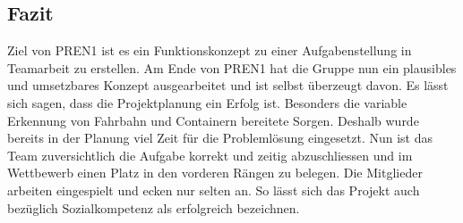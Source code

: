 \subsection{Fazit}
Ziel von PREN1 ist es ein Funktionskonzept zu einer Aufgabenstellung in Teamarbeit zu erstellen. Am Ende von PREN1 hat die Gruppe nun ein plausibles und umsetzbares Konzept ausgearbeitet und ist selbst überzeugt davon. Es lässt sich sagen, dass die Projektplanung ein Erfolg ist. Besonders die variable Erkennung von Fahrbahn und Containern bereitete Sorgen. Deshalb wurde bereits in der Planung viel Zeit für die Problemlösung eingesetzt. Nun ist das Team zuversichtlich die Aufgabe korrekt und zeitig abzuschliessen und im Wettbewerb einen Platz in den vorderen Rängen zu belegen. Die Mitglieder arbeiten eingespielt und ecken nur selten an. So lässt sich das Projekt auch bezüglich Sozialkompetenz als erfolgreich bezeichnen. 




